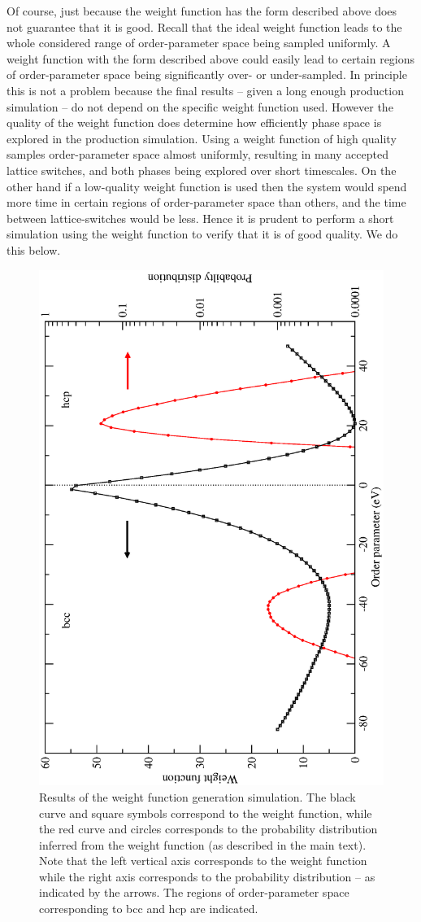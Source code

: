\documentclass{report}
\begin{document}
Of course, just because the weight function has the form described above does not guarantee that it is good. Recall that the ideal weight function
leads to the whole considered range of order-parameter space being sampled uniformly. A weight function with the form described above could easily lead to
certain regions of order-parameter space being significantly over- or under-sampled. In principle this is not a problem because the final results -- given
a long enough production simulation -- do not depend on the specific weight function used. However the quality of the weight function does determine how 
efficiently phase space is explored in the production simulation. Using a weight function of high quality samples order-parameter space almost uniformly, resulting
in many accepted lattice switches, and both phases being explored over short timescales. On the other hand if a low-quality weight function is used then the
system would spend more time in certain regions of order-parameter space than others, and the time between lattice-switches would be less. Hence it is prudent
to perform a short simulation using the weight function to verify that it is of good quality. We do this below.

\begin{figure}
\centering
\includegraphics[height=\textwidth,angle=270]{generation_results}
\caption
{Results of the weight function generation simulation. The black curve and square symbols correspond to the weight function, while the red curve and circles 
corresponds to the probability distribution inferred from the weight function (as described in the main text). Note that the left vertical axis corresponds to the 
weight function while the right axis corresponds to the probability distribution -- as indicated by the arrows. The regions of order-parameter space 
corresponding to bcc and hcp are indicated.}
\label{fig:generation_results}
\end{figure}
\end{document}
